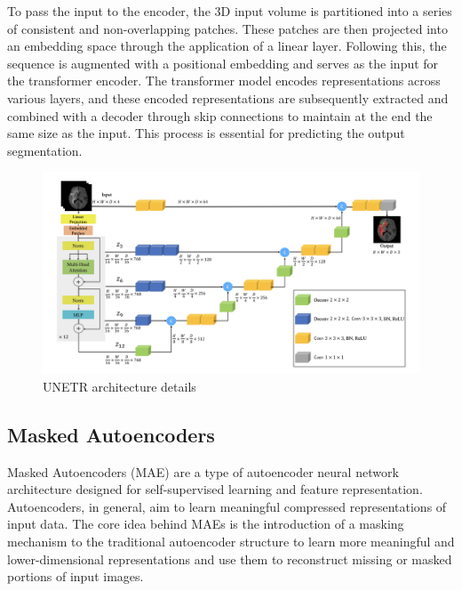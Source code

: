 To pass the input to the encoder, the 3D input volume is partitioned into a series of consistent and non-overlapping patches. These patches are then projected into an embedding space through the application of a linear layer. Following this, the sequence is augmented with a positional embedding and serves as the input for the transformer encoder.
The transformer model encodes representations across various layers, and these encoded representations are subsequently extracted and combined with a decoder through skip connections to maintain at the end the same size as the input. This process is essential for predicting the output segmentation.

\begin{figure}[H]
     \centering
     \includegraphics[scale=0.6]{images/unetr2.png}
     \caption{UNETR architecture details}
     \label{fig:unetr2-architecture}
\end{figure}


\subsection{Masked Autoencoders}

Masked Autoencoders (MAE) \cite{he2022masked}  are a type of autoencoder neural network architecture designed for self-supervised learning and feature representation. Autoencoders, in general, aim to learn meaningful compressed representations of input data. The core idea behind MAEs is the introduction of a masking mechanism to the traditional autoencoder structure to learn more meaningful and lower-dimensional representations and use them to reconstruct missing or masked portions of input images.

